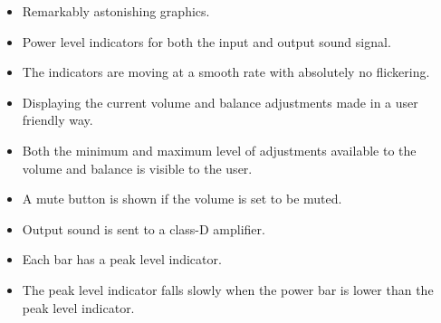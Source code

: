 \begin{itemize}
\item Remarkably astonishing graphics.
\item Power level indicators for both the input and output sound signal. 
\item The indicators are moving at a smooth rate with absolutely no flickering.
\item Displaying the current volume and balance adjustments made in a user friendly way.
\item Both the minimum and maximum level of adjustments available to the volume and balance is visible to the user.
\item A mute button is shown if the volume is set to be muted.
\item Output sound is sent to a class-D amplifier.
\item Each bar has a peak level indicator.
\item The peak level indicator falls slowly when the power bar is lower than the peak level indicator.
\end{itemize}

